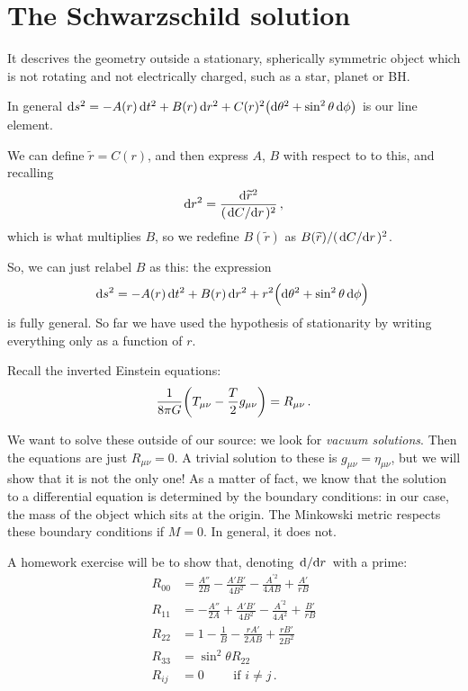 \documentclass[main.tex]{subfiles}
\begin{document}
\section{The Schwarzschild solution}

It descrives the geometry outside a stationary, spherically symmetric object which is not rotating and not electrically charged, such as a star, planet or BH.

In general \(\dd{s^2} = -A(r) \dd{t^2} + B(r) \dd{r^2} + C(r)^2 \qty(\dd{\theta^2} + \sin^2 \theta \dd{\phi })\) is our line element.

We can define \(\widetilde{r} = C(r)\), and then express \(A\), \(B\) with respect to to this, and recalling 
%
\begin{align}
    \dd{r^2} = 
  \frac{\dd{\widetilde{r}^2} }{(\dv*{C}{r})^2}
\,,
\end{align}
%
which is what multiplies \(B\), so we redefine \(B(\widetilde{r}) \) as \(B(\widetilde{r}) / (\dv*{C}{r})^2\).

So, we can just relabel \(B\) as this: the expression 
%
\begin{align}
    \dd{s^2} = -A(r) \dd{t^2} + B(r) \dd{r^2} + r^2\qty(\dd{\theta^2} + \sin^2 \theta \dd{\phi })
\,
\end{align}
%
is fully general. So far we have used the hypothesis of stationarity by writing everything only as a function of \(r\).

Recall the inverted Einstein equations: 
%
\begin{align}
  \frac{1}{8 \pi G} \qty(T_{\mu \nu } - \frac{T}{2} g_{\mu \nu }) = R_{\mu \nu }
\,.
\end{align}
%

We want to solve these outside of our source: we look for \emph{vacuum solutions}. Then the equations are just \(R_{\mu \nu } =0\).
A trivial solution to these is \(g_{\mu \nu } = \eta_{\mu \nu }\), but we will show that it is not the only one!
As a matter of fact, we know that the solution to a differential equation is determined by the boundary conditions: in our case, the mass of the object which sits at the origin.
The Minkowski metric respects these boundary conditions if \(M=0\). In general, it does not.

A homework exercise will be to show that, denoting \(\dv*{}{r}\) with a prime: 
%
\begin{subequations}
\begin{align}
    R_{00} &= \frac{A''}{2B} - \frac{A' B'}{4B^2} - \frac{A^{\prime 2}}{4AB} + \frac{A'}{rB}  \\
    R_{11} &= -\frac{A''}{2A} + \frac{A' B'}{4B^2} - \frac{A^{\prime 2}}{4A^2} + \frac{B'}{rB} \\
    R_{22} &= 1 - \frac{1}{B} - \frac{r A' }{2 AB} + \frac{rB'}{2 B^2}  \\
    R_{33} &= \sin^2 \theta  R_{22} \\
    R_{ij} &= 0 \qquad \text{ if } i \neq j
\,.
\end{align}
\end{subequations}
\end{document}
